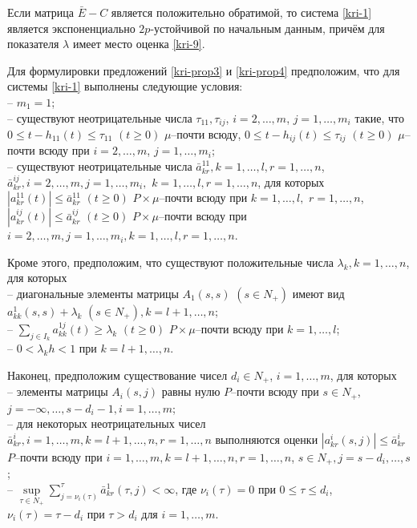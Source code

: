 \begin{proposition}\label{kri-prop2}  Если матрица $\bar E - C$ является
положительно обратимой, то система \eqref{kri-1} является экспоненциально
${2p}$-устойчивой по начальным данным, причём для показателя
$\lambda$ имеет место оценка \eqref{kri-9}.
\end{proposition}

Для формулировки предложений \ref{kri-prop3} и \ref{kri-prop4} предположим, что для системы \eqref{kri-1} выполнены следующие условия:\\
\noindent
  -- $m_1 =1$;\\
   -- существуют неотрицательные числа
$\tau_{11}, \tau_{ij}$, $i = 2,\dots,m$, $j = 1,\dots,m_i$  такие, что
$0 \leq t- h_{11}(t) \leq \tau _{11} {\,} {\,} (t \geq 0)$ $\mu
$--почти всюду, $0 \leq t- h_{ij}(t) \leq \tau _{ij} {\,} {\,} (t
\geq 0)$ $\mu $--почти всюду при $i = 2,\dots,m$, $j = 1,\dots,m_i$;\\
  -- существуют неотрицательные числа
$\bar a^{11}_{kr},  k =1,\dots,l, r = 1,\dots,n$, $\bar a^{ij}_{kr}, i =
2,\dots,m, j = 1,\dots,m_i,$ $k =1,\dots,l, r = 1,\dots,n$,  для которых
$|a^{11}_{kr}(t)|\leq \bar a^{11}_{kr} \,\, (t\geq 0) $
$P\times\mu$--почти всюду при $k =1,\dots,l,$ $r = 1,\dots,n$,
$|a^{ij}_{kr}(t)| \leq \bar a^{ij}_{kr} \,\, (t\geq 0) $
$P\times\mu$--почти всюду при $i = 2, \dots, m, j = 1,\dots,m_i, k
=1,\dots,l, r = 1,\dots,n$.

Кроме этого, предположим, что существуют положительные числа
$\lambda _k, k = 1, \dots, n$, для которых\\
\noindent
-- диагональные
элементы матрицы $ A_1(s,s)$ $(s \in N_+)$ имеют вид
$a_{kk}^{1}(s,s) + \lambda _k \,\, (s \in N_+), k=l + 1, \dots, n$;\\
-- $\sum \limits_{j\in I_k}a^{1j}_{kk}(t)  \geq \lambda _k
\,\, (t\geq 0)$ $P\times\mu$--почти всюду при $k = 1,\dots,l$;\\
-- $0 < \lambda _kh < 1$
при $ k = l + 1, \dots, n$.

Наконец, предположим существование чисел $d_i \in N_+$, $i =
1,\dots,m$, для которых\\
\noindent
 --
 элементы матрицы $A_i(s,j)$ равны нулю
$P$--почти всюду при $s \in N_+$, $j=-\infty,\dots,s-d_i-1,
i=1,\dots,m$;\\
-- для некоторых неотрицательных чисел $\bar
a^i_{kr},i=1,\dots,m, k = l+1, \dots, n, r = 1,\dots,n$ выполняются оценки
$|a^i_{kr}(s,j)| \leq \bar a^i_{kr}$ $P$--почти всюду при
$i=1,\dots,m, k = l+1, \dots, n, r = 1,\dots,n$, $s \in N_+, j = s - d_i,
\dots, s$;\\
--  $\mathrel {\mathop {\sup} \limits _{\tau \in N_+}}\sum
\limits _{j=\nu _i (\tau)}^{\tau}\bar a^{1}_{kr}(\tau,j) < \infty $,
где $\nu _i (\tau) = 0$ при $0 \le \tau \le d_i$, $\nu _i (\tau) =
\tau - d_i$ при $\tau > d_i$ для  $i= 1,\dots,m$.

